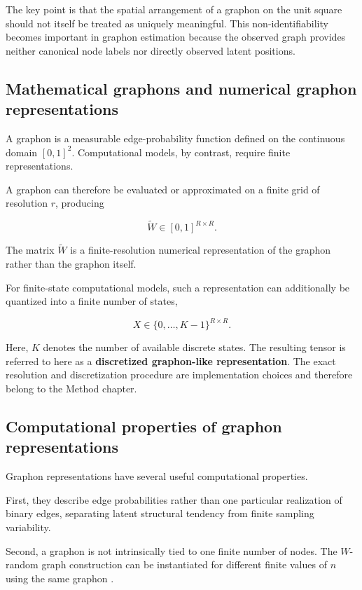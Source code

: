 The key point is that the spatial arrangement of a graphon on the unit square should not itself be treated as uniquely meaningful. This non-identifiability becomes important in graphon estimation because the observed graph provides neither canonical node labels nor directly observed latent positions.


\subsection{Mathematical graphons and numerical graphon representations}
\label{subsec:numerical_graphon_representation}

A graphon is a measurable edge-probability function defined on the continuous domain \([0,1]^2\). Computational models, by contrast, require finite representations.

A graphon can therefore be evaluated or approximated on a finite grid of resolution \(r\), producing

\[
\widetilde{W}\in[0,1]^{R\times R}.
\]

The matrix \(\widetilde{W}\) is a finite-resolution numerical representation of the graphon rather than the graphon itself.

For finite-state computational models, such a representation can additionally be quantized into a finite number of states,

\[
X\in\{0,\ldots,K-1\}^{R\times R}.
\]

Here, \(K\) denotes the number of available discrete states. The resulting tensor is referred to here as a \textbf{discretized graphon-like representation}. The exact resolution and discretization procedure are implementation choices and therefore belong to the Method chapter.


\subsection{Computational properties of graphon representations}
\label{subsec:graphons_intermediate_representation}

Graphon representations have several useful computational properties.

First, they describe edge probabilities rather than one particular realization of binary edges, separating latent structural tendency from finite sampling variability.

Second, a graphon is not intrinsically tied to one finite number of nodes. The \(W\)-random graph construction can be instantiated for different finite values of \(n\) using the same graphon \cite{lovasz2006limits}.

